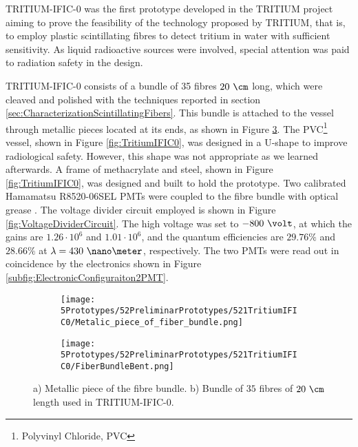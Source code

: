 TRITIUM-IFIC-0 was the first prototype developed in the TRITIUM project aiming to prove the feasibility of the technology proposed by TRITIUM, that is, to employ plastic scintillating fibres to detect tritium in water with sufficient sensitivity. As liquid radioactive sources were involved, special attention was paid to radiation safety in the design.

TRITIUM-IFIC-0 consists of a bundle of 35 fibres $20~\cm$ long, which were cleaved and polished with the techniques reported in section \ref{sec:CharacterizationScintillatingFibers}. This bundle is attached to the vessel through metallic pieces located at its ends, as shown in Figure \ref{fig:FiberBundleOfTritiumIFIC0}. The PVC\footnote{Polyvinyl Chloride, PVC} vessel, shown in Figure \ref{fig:TritiumIFIC0}, was designed in a U-shape to improve radiological safety. However, this shape was not appropriate as we learned afterwards. A frame of methacrylate and steel, shown in Figure \ref{fig:TritiumIFIC0}, was designed and built to hold the prototype. Two calibrated Hamamatsu R8520-06SEL PMTs \cite{DataSheetPMTs} were coupled to the fibre bundle with optical grease \cite{OpticalGrease}. The voltage divider circuit employed is shown in Figure  \ref{fig:VoltageDividerCircuit}. The high voltage was set to $-800~\volt$, at which the gains are $1.26 \cdot{} 10^6$ and $1.01 \cdot{} 10^6$, and the quantum efficiencies are $29.76\%$ and $28.66\%$ at $\lambda=430~\nano\meter$, respectively. The two PMTs were read out in coincidence by the electronics shown in Figure \ref{subfig:ElectronicConfiguraiton2PMT}.

\begin{figure}
\centering
    \begin{subfigure}[b]{0.5\textwidth}
    \centering
    \texttt{[image: 5Prototypes/52PreliminarPrototypes/521TritiumIFIC0/Metalic\_piece\_of\_fiber\_bundle.png]}  
    \caption{\label{subfig:MetalicPieceFiberBunchTritiumIFIC0}}
    \end{subfigure}
    \hfill
    \begin{subfigure}[b]{0.4\textwidth}
    \centering
    \texttt{[image: 5Prototypes/52PreliminarPrototypes/521TritiumIFIC0/FiberBundleBent.png]}  
    \caption{\label{subfig:FiberBunchTritiumIFIC0Bent}}
    \end{subfigure}
 \caption{a) Metallic piece of the fibre bundle. b) Bundle of $35$ fibres of $20~\cm$ length used in TRITIUM-IFIC-0.} \label{fig:FiberBundleOfTritiumIFIC0}
\end{figure}

